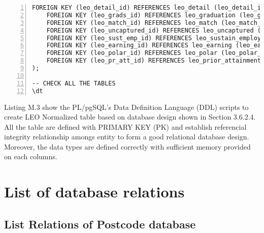 \begin{lstlisting}[breaklines, frame=single, numbers=left, caption={PL/pgSQL's DDL scripts for Education Normalized Table Creation.}, label=commandline-02]
	FOREIGN KEY (leo_detail_id) REFERENCES leo_detail (leo_detail_id) ON DELETE CASCADE,
	FOREIGN KEY (leo_grads_id) REFERENCES leo_graduation (leo_grads_id) ON DELETE CASCADE,
	FOREIGN KEY (leo_match_id) REFERENCES leo_match (leo_match_id) ON DELETE CASCADE,
	FOREIGN KEY (leo_uncaptured_id) REFERENCES leo_uncaptured (leo_uncaptured_id) ON DELETE CASCADE, 
	FOREIGN KEY (leo_sust_emp_id) REFERENCES leo_sustain_employment (leo_sust_emp_id) ON DELETE CASCADE,
	FOREIGN KEY (leo_earning_id) REFERENCES leo_earning (leo_earning_id) ON DELETE CASCADE,
	FOREIGN KEY (leo_polar_id) REFERENCES leo_polar (leo_polar_id) ON DELETE CASCADE,
	FOREIGN KEY (leo_pr_att_id) REFERENCES leo_prior_attainment (leo_pr_att_id) ON DELETE CASCADE 
);

-- CHECK ALL THE TABLES 
\dt

\end{lstlisting}

Listing M.3 show the PL/pgSQL's Data Definition Language (DDL) scripts to create LEO Normalized table based on database design shown in Section 3.6.2.4. All the table are defined with PRIMARY KEY (PK) and establish referencial integrity relationship amongs entity to form a good relational database design. Moreover, the data types are defined correctly with sufficient memory provided on each columns.

\pagebreak

\section{List of database relations}

\subsection{List Relations of Postcode database}

